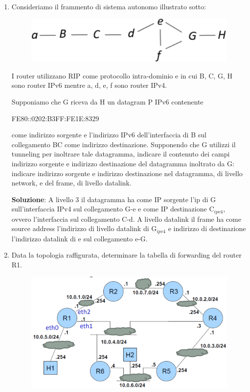\documentclass[11pt,a4paper,oneside]{book}
\theoremstyle{definition}
\begin{document}
\begin{enumerate}
	\item Consideriamo il frammento di sistema autonomo illustrato sotto:

	      \begin{figure}[!h]
		      \includegraphics[scale=0.5]{Immagini/Es7.png}
		      \centering
	      \end{figure}

	      \pagebreak

	      I router utilizzano RIP come protocollo intra-dominio e in cui B, C,
	      G, H sono router IPv6 mentre a, d, e, f sono router IPv4.

	      Supponiamo che G riceva da H un datagram P IPv6 contenente
	      \begin{center}
		      FE80::0202:B3FF:FE1E:8329
	      \end{center}
	      come indirizzo sorgente e l’indirizzo
	      IPv6 dell’interfaccia di B sul collegamento BC come indirizzo
	      destinazione. Supponendo che G utilizzi il tunneling per inoltrare
	      tale datagramma, indicare il contenuto dei campi indirizzo sorgente e
	      indirizzo destinazione del datagramma inoltrato da G: indicare
	      indirizzo sorgente e indirizzo destinazione nel datagramma, di livello
	      network, e del frame, di livello datalink.

	      \textbf{Soluzione}: A livello 3 il datagramma ha come IP sorgente l’ip di G sull’interfaccia IPv4 sul collegamento G-e e come IP destinazione C$_{ipv4}$, ovvero l'interfaccia sul collegamento C-d.
	      A livello datalink il frame ha come source address l’indirizzo di livello datalink di G$_{ipv4}$ e indirizzo di destinazione l’indirizzo datalink di e sul collegamento e-G.

	\item Data la topologia raffigurata, determinare la
	      tabella di forwarding del router R1.

	      \begin{figure}[!h]
		      \includegraphics[scale=0.4]{Immagini/Es8.png}
		      \centering
	      \end{figure}


\end{enumerate}
\end{document}
